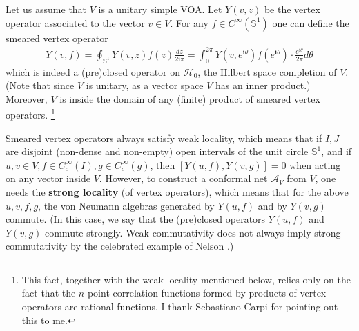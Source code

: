 \documentclass[12pt,a4paper]{article}
\theoremstyle{definition}
\theoremstyle{plain}
\newcommand{\mc}{\mathcal}
\newcommand{\im}{\mathbf{i}}
\newcommand{\mbb}{\mathbb}
\numberwithin{equation}{subsection}
\begin{document}
Let us assume that $V$ is a unitary simple VOA.  Let $Y(v,z)$ be the vertex operator associated to the vector $v\in V$. For any $f\in C^\infty(\mbb S^1)$ one can define the smeared vertex operator
\begin{align}
Y(v,f)=\oint_{\mbb S^1} Y(v,z)f(z)\frac{dz}{2\im\pi}=\int_0^{2\pi}Y(v,e^{\im\theta})f(e^{\im\theta})\cdot\frac{e^{\im\theta}}{2\pi}d\theta
\end{align}
which is indeed a (pre)closed operator on $\mc H_0$, the Hilbert space completion of $V$. (Note that since $V$ is unitary, as a vector space $V$ has an inner product.) Moreover, $V$ is inside the domain of any (finite) product of smeared vertex operators. \footnote{This fact, together with the weak locality mentioned below, relies only on the fact that the $n$-point correlation functions formed by products of vertex operators are rational functions. I thank Sebastiano Carpi for pointing out this to me.}

Smeared vertex operators always satisfy weak locality, which means that if $I,J$ are disjoint (non-dense and non-empty) open intervals of the unit circle $\mbb S^1$, and if $u,v\in V,f\in C_c^\infty(I),g\in C_c^\infty(g)$, then $[Y(u,f),Y(v,g)]=0$ when acting on any vector inside $V$. However, to construct a conformal net $\mc A_V$ from $V$, one needs the \textbf{strong locality} (of vertex operators), which means that for the above $u,v,f,g$, the von Neumann algebras generated by $Y(u,f)$ and by $Y(v,g)$ commute. (In this case, we say that the (pre)closed operators $Y(u,f)$ and $Y(v,g)$ commute strongly. Weak commutativity does not always imply strong commutativity by the celebrated example of Nelson \cite{Nel59}.) 
\end{document}
